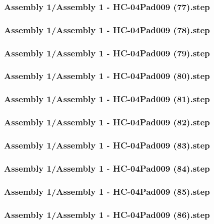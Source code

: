 \documentclass[a4paper,12pt]{article}
\begin{document}
\subsubsection{Assembly 1/Assembly 1 - HC-04Pad009 (77).step}

\subsubsection{Assembly 1/Assembly 1 - HC-04Pad009 (78).step}

\subsubsection{Assembly 1/Assembly 1 - HC-04Pad009 (79).step}

\subsubsection{Assembly 1/Assembly 1 - HC-04Pad009 (80).step}

\subsubsection{Assembly 1/Assembly 1 - HC-04Pad009 (81).step}

\subsubsection{Assembly 1/Assembly 1 - HC-04Pad009 (82).step}

\subsubsection{Assembly 1/Assembly 1 - HC-04Pad009 (83).step}

\subsubsection{Assembly 1/Assembly 1 - HC-04Pad009 (84).step}

\subsubsection{Assembly 1/Assembly 1 - HC-04Pad009 (85).step}

\subsubsection{Assembly 1/Assembly 1 - HC-04Pad009 (86).step}

\end{document}
